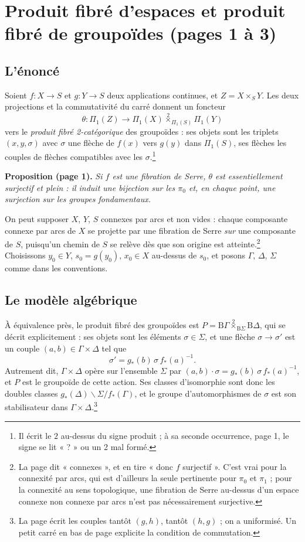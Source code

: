 \documentclass[11pt,a4paper]{article}
\begin{document}
\section*{Produit fibré d'espaces et produit fibré de groupoïdes (pages 1 à 3)}

\subsection*{L'énoncé}

Soient $f : X \to S$ et $g : Y \to S$ deux applications continues, et
$Z = X \times_S Y$. Les deux projections et la commutativité du carré donnent
un foncteur
\[
  \theta : \Pi_1(Z) \longrightarrow
  \Pi_1(X) \overset{2}{\times}_{\Pi_1(S)} \Pi_1(Y)
\]
vers le \emph{produit fibré 2-catégorique} des groupoïdes : ses objets sont
les triplets $(x, y, \sigma)$ avec $\sigma$ une flèche de $f(x)$ vers $g(y)$
dans $\Pi_1(S)$, ses flèches les couples de flèches compatibles avec les
$\sigma$.\footnote{Il écrit le $2$ au-dessus du signe produit ; à sa seconde
occurrence, page 1, le signe se lit « ? » ou un 2 mal formé.}

\textbf{Proposition (page 1).} \emph{Si $f$ est une fibration de Serre,
$\theta$ est essentiellement surjectif et plein : il induit une bijection sur
les $\pi_0$ et, en chaque point, une surjection sur les groupes
fondamentaux.}

On peut supposer $X$, $Y$, $S$ connexes par arcs et non vides : chaque
composante connexe par arcs de $X$ se projette par une fibration de Serre
\emph{sur} une composante de $S$, puisqu'un chemin de $S$ se relève dès que
son origine est atteinte.\footnote{La page dit « connexes », et en tire « donc
$f$ surjectif ». C'est vrai pour la connexité par arcs, qui est d'ailleurs la
seule pertinente pour $\pi_0$ et $\pi_1$ ; pour la connexité au sens
topologique, une fibration de Serre au-dessus d'un espace connexe non connexe
par arcs n'est pas nécessairement surjective.} Choisissons $y_0 \in Y$,
$s_0 = g(y_0)$, $x_0 \in X$ au-dessus de $s_0$, et posons
$\Gamma$, $\Delta$, $\Sigma$ comme dans les conventions.

\subsection*{Le modèle algébrique}

À équivalence près, le produit fibré des groupoïdes est
$P = \mathrm{B}\Gamma \overset{2}{\times}_{\mathrm{B}\Sigma} \mathrm{B}\Delta$,
qui se décrit explicitement : ses objets sont les éléments $\sigma \in
\Sigma$, et une flèche $\sigma \to \sigma'$ est un couple $(a, b) \in \Gamma
\times \Delta$ tel que
\[
  \sigma' = g_*(b)\, \sigma\, f_*(a)^{-1} .
\]
Autrement dit, $\Gamma \times \Delta$ opère sur l'ensemble $\Sigma$ par
$(a, b) \cdot \sigma = g_*(b)\, \sigma\, f_*(a)^{-1}$, et $P$ est le
groupoïde de cette action. Ses classes d'isomorphie sont donc les doubles
classes $g_*(\Delta) \backslash \Sigma / f_*(\Gamma)$, et le groupe
d'automorphismes de $\sigma$ est son stabilisateur dans $\Gamma \times
\Delta$.\footnote{La page écrit les couples tantôt $(g, h)$, tantôt
$(h, g)$ ; on a uniformisé. Un petit carré en bas de page explicite la
condition de commutation.}
\end{document}
